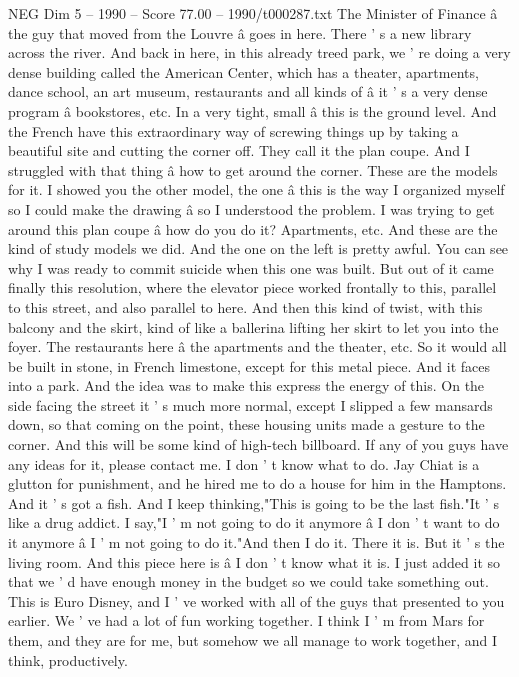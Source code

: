 \begin{textsample}{NEG Dim 5 – 1990 – Score 77.00 – 1990/t000287.txt}
The Minister of Finance â the guy that moved from the Louvre â goes in here.
There ' s a new library across the river.
And back in here, in this already treed park, we ' re doing a very dense building called the American Center, which has a theater, apartments, dance school, an art museum, restaurants and all kinds of â it ' s a very dense program â bookstores, etc.
In a very tight, small â this is the ground level.
And the French have this extraordinary way of screwing things up by taking a beautiful site and cutting the corner off.
They call it the plan coupe.
And I struggled with that thing â how to get around the corner.
These are the models for it.
I showed you the other model, the one â this is the way I organized myself so I could make the drawing â so I understood the problem.
I was trying to get around this plan coupe â how do you do it?
Apartments, etc.
And these are the kind of study models we did.
And the one on the left is pretty awful.
You can see why I was ready to commit suicide when this one was built.
But out of it came finally this resolution, where the elevator piece worked frontally to this, parallel to this street, and also parallel to here.
And then this kind of twist, with this balcony and the skirt, kind of like a ballerina lifting her skirt to let you into the foyer.
The restaurants here â the apartments and the theater, etc.
So it would all be built in stone, in French limestone, except for this metal piece.
And it faces into a park.
And the idea was to make this express the energy of this.
On the side facing the street it ' s much more normal, except I slipped a few mansards down, so that coming on the point, these housing units made a gesture to the corner.
And this will be some kind of high-tech billboard.
If any of you guys have any ideas for it, please contact me.
I don ' t know what to do.
Jay Chiat is a glutton for punishment, and he hired me to do a house for him in the Hamptons.
And it ' s got a fish.
And I keep thinking,"This is going to be the last fish."It ' s like a drug addict.
I say,"I ' m not going to do it anymore â I don ' t want to do it anymore â I ' m not going to do it."And then I do it.
There it is.
But it ' s the living room.
And this piece here is â I don ' t know what it is.
I just added it so that we ' d have enough money in the budget so we could take something out.
This is Euro Disney, and I ' ve worked with all of the guys that presented to you earlier.
We ' ve had a lot of fun working together.
I think I ' m from Mars for them, and they are for me, but somehow we all manage to work together, and I think, productively.

\end{textsample}
